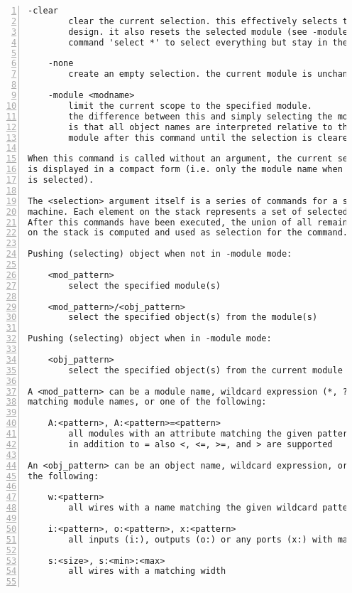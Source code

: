 \begin{lstlisting}[numbers=left,frame=single]
    -clear
        clear the current selection. this effectively selects the whole
        design. it also resets the selected module (see -module). use the
        command 'select *' to select everything but stay in the current module.

    -none
        create an empty selection. the current module is unchanged.

    -module <modname>
        limit the current scope to the specified module.
        the difference between this and simply selecting the module
        is that all object names are interpreted relative to this
        module after this command until the selection is cleared again.

When this command is called without an argument, the current selection
is displayed in a compact form (i.e. only the module name when a whole module
is selected).

The <selection> argument itself is a series of commands for a simple stack
machine. Each element on the stack represents a set of selected objects.
After this commands have been executed, the union of all remaining sets
on the stack is computed and used as selection for the command.

Pushing (selecting) object when not in -module mode:

    <mod_pattern>
        select the specified module(s)

    <mod_pattern>/<obj_pattern>
        select the specified object(s) from the module(s)

Pushing (selecting) object when in -module mode:

    <obj_pattern>
        select the specified object(s) from the current module

A <mod_pattern> can be a module name, wildcard expression (*, ?, [..])
matching module names, or one of the following:

    A:<pattern>, A:<pattern>=<pattern>
        all modules with an attribute matching the given pattern
        in addition to = also <, <=, >=, and > are supported

An <obj_pattern> can be an object name, wildcard expression, or one of
the following:

    w:<pattern>
        all wires with a name matching the given wildcard pattern

    i:<pattern>, o:<pattern>, x:<pattern>
        all inputs (i:), outputs (o:) or any ports (x:) with matching names

    s:<size>, s:<min>:<max>
        all wires with a matching width


\end{lstlisting}
